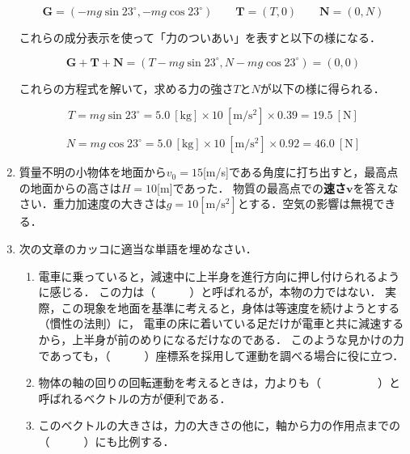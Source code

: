 \documentclass[a4paper,11pt]{ltjsarticle}
\begin{document}
\begin{enumerate}
    \begin{equation*}
        \bm{G}=(-mg\sin23^{\circ},-mg\cos23^{\circ})
        \qquad
        \bm{T}=(T,0)
        \qquad
        \bm{N}=(0,N)
    \end{equation*}

    これらの成分表示を使って「力のついあい」を表すと以下の様になる．

    \begin{equation*}
        \bm{G}+\bm{T}+\bm{N}=(T-mg\sin23^{\circ},N-mg\cos23^{\circ})=(0,0)
    \end{equation*}

    これらの方程式を解いて，求める力の強さ$T$と$N$が以下の様に得られる．

    \begin{equation*}
        T=mg\sin23^{\circ}=5.0\ [\mathrm{kg}] \times 10\ [\mathrm{m/s^2}] \times 0.39 = 19.5\ [\mathrm{N}]
    \end{equation*}

    \begin{equation*}
        N=mg\cos23^{\circ}=5.0\ [\mathrm{kg}] \times 10\ [\mathrm{m/s^2}] \times 0.92 = 46.0\ [\mathrm{N}]
    \end{equation*}

\clearpage

    \item 質量不明の小物体を地面から$v_0=15$[m/s]である角度に打ち出すと，最高点の地面からの高さは$H=10$[m]であった．
    物質の最高点での\textbf{速さ}$\bm{v}$を答えなさい．重力加速度の大きさは$g=10[\mathrm{m/s^2}]$とする．空気の影響は無視できる．

\clearpage

    \item 次の文章のカッコに適当な単語を埋めなさい．
    
    \vspace{5pt}

    \begin{enumerate}[label=(\arabic*)]
        \item 電車に乗っていると，減速中に上半身を進行方向に押し付けられるように感じる．
        この力は（　　　）と呼ばれるが，本物の力ではない．
        実際，この現象を地面を基準に考えると，身体は等速度を続けようとする（慣性の法則）に，
        電車の床に着いている足だけが電車と共に減速するから，上半身が前のめりになるだけなのである．
        このような見かけの力であっても，（　　　）座標系を採用して運動を調べる場合に役に立つ．

        \item 物体の軸の回りの回転運動を考えるときは，力よりも（　　　　　）と呼ばれるベクトルの方が便利である．
        \item このベクトルの大きさは，力の大きさの他に，軸から力の作用点までの（　　　）にも比例する．
    \end{enumerate}


\end{enumerate}
\end{document}
